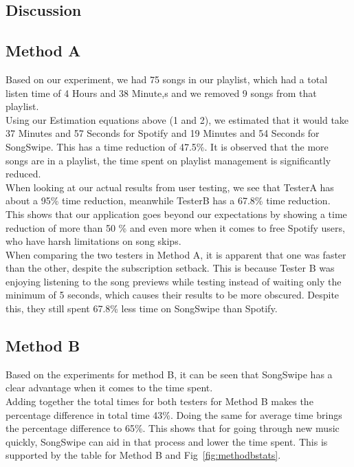 \documentclass{article}
\begin{document}
\subsection{Discussion}

\subsection*{Method A}
Based on our experiment, we had 75 songs in our playlist, which had a total listen time of 4 Hours and 38 Minute,s and we removed 9 songs from that playlist. \\
    
Using our Estimation equations above (1 and 2), we estimated that it would take 37 Minutes and 57 Seconds for Spotify and 19 Minutes and 54 Seconds for SongSwipe. This has a time reduction of 47.5\%. It is observed that the more songs are in a playlist, the time spent on playlist management is significantly reduced.\\
    
When looking at our actual results from user testing, we see that TesterA has about a 95\% time reduction, meanwhile TesterB has a 67.8\% time reduction. This shows that our application goes beyond our expectations by showing a time reduction of more than 50 \% and even more when it comes to free Spotify users, who have harsh limitations on song skips. \\

When comparing the two testers in Method A, it is apparent that one was faster than the other, despite the subscription setback. This is because Tester B was enjoying listening to the song previews while testing instead of waiting only the minimum of 5 seconds, which causes their results to be more obscured. Despite this, they still spent 67.8\% less time on SongSwipe than Spotify.     \\

\subsection*{Method B}
Based on the experiments for method B, it can be seen that SongSwipe has a clear advantage when it comes to the time spent. \\

Adding together the total times for both testers for Method B makes the percentage difference in total time 43\%. Doing the same for average time brings the percentage difference to 65\%. This shows that for going through new music quickly, SongSwipe can aid in that process and lower the time spent. This is supported by the table for Method B and Fig~\ref{fig:methodbstats}. \\
\end{document}
